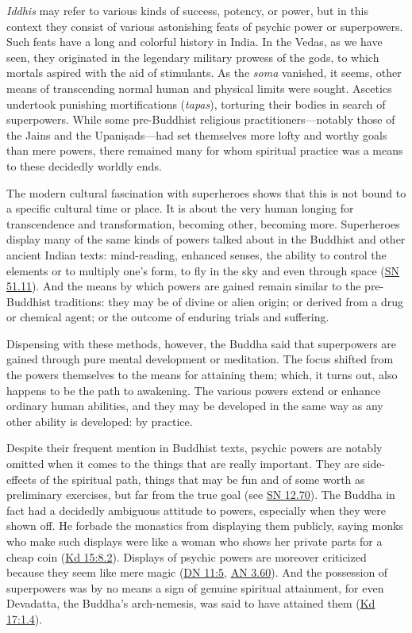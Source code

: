\documentclass[12pt,openany]{book}%
\begin{document}
\textit{Iddhis} may refer to various kinds of success, potency, or power, but in this context they consist of various astonishing feats of psychic power or superpowers. Such feats have a long and colorful history in India. In the Vedas, as we have seen, they originated in the legendary military prowess of the gods, to which mortals aspired with the aid of stimulants. As the \textit{soma} vanished, it seems, other means of transcending normal human and physical limits were sought. Ascetics undertook punishing mortifications (\textit{tapas}), torturing their bodies in search of superpowers. While some pre-Buddhist religious practitioners—notably those of the Jains and the \textsanskrit{Upaniṣads}—had set themselves more lofty and worthy goals than mere powers, there remained many for whom spiritual practice was a means to these decidedly worldly ends.

The modern cultural fascination with superheroes shows that this is not bound to a specific cultural time or place. It is about the very human longing for transcendence and transformation, becoming other, becoming more. Superheroes display many of the same kinds of powers talked about in the Buddhist and other ancient Indian texts: mind-reading, enhanced senses, the ability to control the elements or to multiply one’s form, to fly in the sky and even through space (\href{https://suttacentral.net/sn51.11}{SN 51.11}). And the means by which powers are gained remain similar to the pre-Buddhist traditions: they may be of divine or alien origin; or derived from a drug or chemical agent; or the outcome of enduring trials and suffering.

Dispensing with these methods, however, the Buddha said that superpowers are gained through pure mental development or meditation. The focus shifted from the powers themselves to the means for attaining them; which, it turns out, also happens to be the path to awakening. The various powers extend or enhance ordinary human abilities, and they may be developed in the same way as any other ability is developed: by practice.

Despite their frequent mention in Buddhist texts, psychic powers are notably omitted when it comes to the things that are really important. They are side-effects of the spiritual path, things that may be fun and of some worth as preliminary exercises, but far from the true goal (see \href{https://suttacentral.net/sn12.70}{SN 12.70}). The Buddha in fact had a decidedly ambiguous attitude to powers, especially when they were shown off. He forbade the monastics from displaying them publicly, saying monks who make such displays were like a woman who shows her private parts for a cheap coin (\href{https://suttacentral.net/pli{-}tv{-}kd15\#8.2}{Kd 15:8.2}). Displays of psychic powers are moreover criticized because they seem like mere magic (\href{https://suttacentral.net/dn11\#5}{DN 11:5}, \href{https://suttacentral.net/an3.60}{AN 3.60}). And the possession of superpowers was by no means a sign of genuine spiritual attainment, for even Devadatta, the Buddha’s arch-nemesis, was said to have attained them (\href{https://suttacentral.net/pli{-}tv{-}kd17\#1.4}{Kd 17:1.4}).
\end{document}

